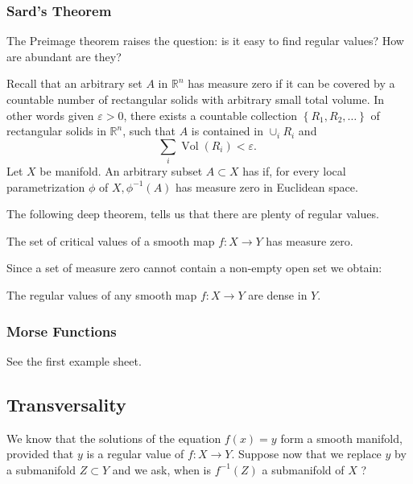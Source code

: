 \documentclass[a4paper, 10pt, twocolumn]{amsart}
\begin{document}
\subsubsection{Sard's Theorem}

The Preimage theorem raises the question: is it easy to find regular values? How are abundant are they?

Recall that an arbitrary set $A$ in $\mathbb{R}^{n}$ has measure zero if it can be covered by a countable number of rectangular solids with arbitrary small total volume. In other words given $\varepsilon>0$, there exists a countable collection $\left\{R_{1}, R_{2}, \ldots\right\}$ of rectangular solids in $\mathbb{R}^{n}$, such that $A$ is contained in $\cup_{i} R_{i}$ and
$$
\sum_{i} \operatorname{Vol}\left(R_{i}\right)<\varepsilon \text {. }
$$
Let $X$ be manifold. An arbitrary subset $A \subset X$ has  if, for every local parametrization $\phi$ of $X, \phi^{-1}(A)$ has measure zero in Euclidean space.

The following deep theorem, tells us that there are plenty of regular values.

\begin{theorem}
    The set of critical values of a smooth map $f: X \rightarrow Y$ has measure zero.
\end{theorem}

Since a set of measure zero cannot contain a non-empty open set we obtain:

\begin{corollary}
    The regular values of any smooth map $f: X \rightarrow Y$ are dense in $Y$.
\end{corollary}

\subsubsection{Morse Functions}

See the first example sheet.


\subsection{Transversality}

We know that the solutions of the equation $f(x)=y$ form a smooth manifold, provided that $y$ is a regular value of $f: X \rightarrow Y$. Suppose now that we replace $y$ by a submanifold $Z \subset Y$ and we ask, when is $f^{-1}(Z)$ a submanifold of $X$ ?
\end{document}
